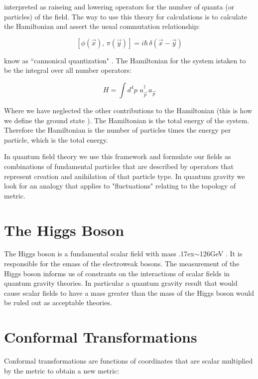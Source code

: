 \documentclass[%
 reprint,
 amsmath,amssymb,
 aps,
]{revtex4-1}
\begin{document}
interpreted as raiseing and lowering operators for the number of quanta (or particles) of the field. The way to use this theory for calculations is to calculate the Hamiltonian and assert the usual commutation relationship:

\begin{equation}
\left[ \phi(\vec{x}) , \, \pi(\vec{y}) \right] =  i \hbar \, \delta(\vec{x} - \vec{y})
\end{equation}

know as ``cannonical quantization" \cite{tong}. The Hamiltonian for the system istaken to be the integral over all number operators:

\begin{equation}
H = \int d^4p \,\, a_{\vec{p}} ^{\dagger} \, a_{\vec{p}}
\end{equation}

Where we have neglected the other contributions to the Hamiltonian (this is how we define the ground state \cite{atchandhey}). The Hamiltonian is the total energy of the system. Therefore the Hamiltonian is the number of particles times the energy per particle, which is the total energy. 

In quantum field theory we use this framework and formulate our fields as combinations of fundamental particles that are described by operators that represent creation and anihilation of that particle type. In quantum gravity we look for an analogy that applies to "fluctuations" relating to the topology of metric.

\section{The Higgs Boson}
The Higgs boson is a fundamental scalar field with mass \raise.17ex\hbox{$\scriptstyle\sim$}126GeV \cite{higgsboson}. It is responsible for the emass of the electroweak bosons. The measurement of the Higgs boson informs us of constrants on the interactions of scalar fields in quantum gravity theories. In particular a quantum gravity result that would cause scalar fields to have a mass greater than the mass of the Higgs boson would be ruled out as acceptable theories.

\section{Conformal Transformations}
Conformal transformations are functions of coordinates that are scalar multiplied by the metric to obtain a new metric:
\end{document}
